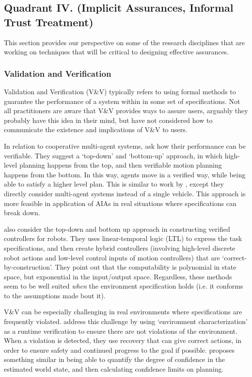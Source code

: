 \subsection{Quadrant IV. (Implicit Assurances, Informal Trust Treatment)}\label{sec:q4}
This section provides our perspective on some of the research disciplines that are working on techniques that will be critical to designing effective assurances.

\subsubsection{Validation and Verification}
    Validation and Verification (V\&V) typically refers to using formal methods to guarantee the performance of a system within in some set of specifications. Not all practitioners are aware that V\&V provides ways to assure users, arguably they probably have this idea in their mind, but have not considered how to communicate the existence and implications of V\&V to users.

    In relation to cooperative multi-agent systems, \citet{Da_Silva2016-qb} ask how their performance can be verifiable. They suggest a `top-down' and `bottom-up' approach, in which high-level planning happens from the top, and then verifiable motion planning happens from the bottom. In this way, agents move in a verified way, while being able to satisfy a higher level plan. This is similar to work by \citet{Conner2007-uw}, except they directly consider multi-agent systems instead of a single vehicle. This approach is more feasible in application of AIAs in real situations where specifications can break down.

    \citet{Kress-Gazit2009-wf} also consider the top-down and bottom up approach in constructing verified controllers for robots. They uses linear-temporal logic (LTL) to express the task specifications, and then create hybrid controllers (involving high-level discrete robot actions and low-level control inputs of motion controllers) that are `correct-by-construction'. They point out that the computability  is polynomial in state space, but exponential in the input/output space. Regardless, these methods seem to be well suited \emph{when} the environment specification holds (i.e. it conforms to the assumptions made bout it).

    V\&V can be especially challenging in real environments where specifications are frequently violated. \citet{Weng_Wong2014-tj} address this challenge by using `environment characterization' as a runtime verification to ensure there are not violations of the environment. When a violation is detected, they use recovery that can give correct actions, in order to ensure safety and continued progress to the goal if possible. \citet{Nishi2016-zq} proposes something similar in being able to quantify the degree of confidence in the estimated world state, and then calculating confidence limits on planning.


